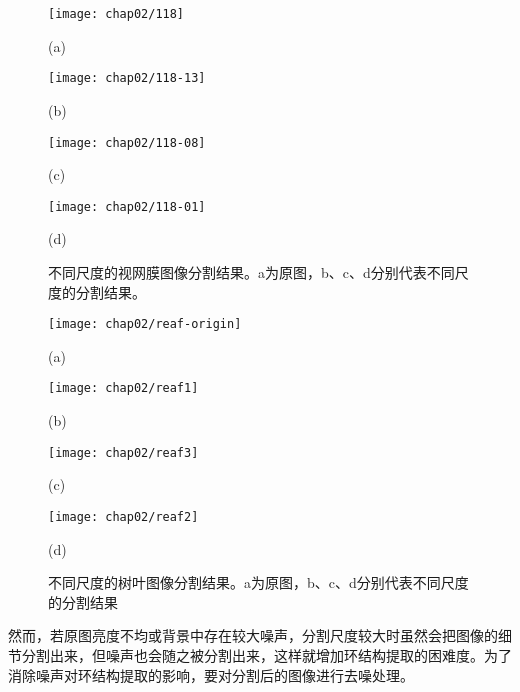 \begin{figure}
\centering
  \begin{minipage}[b]{0.48\textwidth} 
      \centering 
      \texttt{[image: chap02/118]}
        \centerline{(a)}\medskip
    \end{minipage}
  \begin{minipage}[b]{0.48\textwidth}
    \centering
    \texttt{[image: chap02/118-13]}
      \centerline{(b)}\medskip
  \end{minipage}
  \begin{minipage}[b]{0.48\textwidth}
    \centering
    \texttt{[image: chap02/118-08]}
      \centerline{(c)}\medskip
  \end{minipage}
  \begin{minipage}[b]{0.48\textwidth}
    \centering
    \texttt{[image: chap02/118-01]}
      \centerline{(d)}\medskip
	\label{fig:max}
  \end{minipage}
\caption{不同尺度的视网膜图像分割结果。a为原图，b、c、d分别代表不同尺度的分割结果。}
\label{fig:Segmentaion-retinal}
\end{figure}

\begin{figure}
\centering
  \begin{minipage}[b]{0.48\textwidth} 
      \centering 
      \texttt{[image: chap02/reaf-origin]}
        \centerline{(a)}\medskip
    \end{minipage}
  \begin{minipage}[b]{0.48\textwidth}
    \centering
    \texttt{[image: chap02/reaf1]}
      \centerline{(b)}\medskip
  \end{minipage}
  \begin{minipage}[b]{0.48\textwidth}
    \centering
    \texttt{[image: chap02/reaf3]}
      \centerline{(c)}\medskip
  \end{minipage}
  \begin{minipage}[b]{0.48\textwidth}
    \centering
    \texttt{[image: chap02/reaf2]}
      \centerline{(d)}\medskip
	\label{fig:max}
  \end{minipage}
\caption{不同尺度的树叶图像分割结果。a为原图，b、c、d分别代表不同尺度的分割结果}
\label{fig:Segmentaion-retinal1}
\end{figure}

然而，若原图亮度不均或背景中存在较大噪声，分割尺度较大时虽然会把图像的细节分割出来，但噪声也会随之被分割出来，这样就增加环结构提取的困难度。为了消除噪声对环结构提取的影响，要对分割后的图像进行去噪处理。

